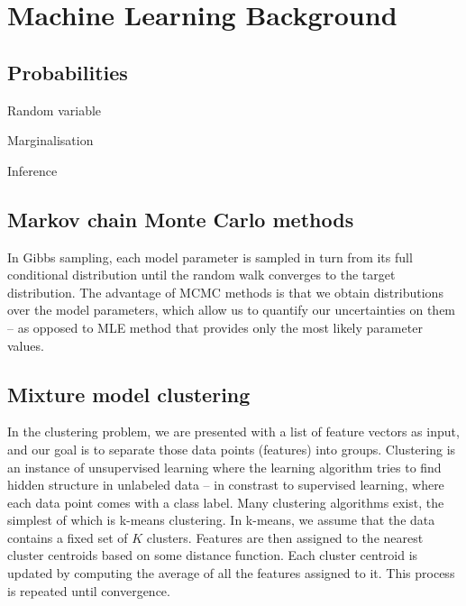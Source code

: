 \chapter{Machine Learning Background}
\label{c:ml-background}


\section{Probabilities}

Random variable

Marginalisation

Inference

\section{Markov chain Monte Carlo methods}

In Gibbs sampling, each model parameter is sampled in turn from its full conditional distribution until the random walk converges to the target distribution. The advantage of MCMC methods is that we obtain distributions over the model parameters, which allow us to quantify our uncertainties on them -- as opposed to MLE method that provides only the most likely parameter values.

\section{Mixture model clustering}

In the clustering problem, we are presented with a list of feature vectors as input, and our goal is to separate those data points (features) into groups. Clustering is an instance of unsupervised learning where the learning algorithm tries to find hidden structure in unlabeled data -- in constrast to supervised learning, where each data point comes with a class label. Many clustering algorithms exist, the simplest of which is k-means clustering. In k-means, we assume that the data contains a fixed set of $K$ clusters. Features are then assigned to the nearest cluster centroids based on some distance function. Each cluster centroid is updated by computing the average of all the features assigned to it. This process is repeated until convergence. 


